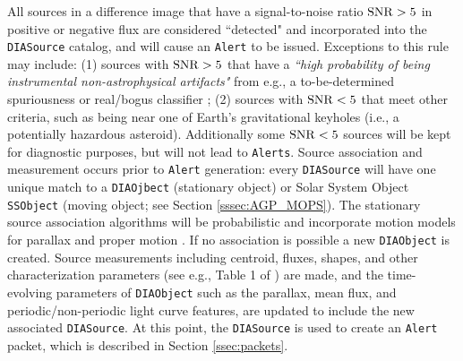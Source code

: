 All sources in a difference image that have a signal-to-noise ratio ${\rm SNR}>5$ in positive or negative flux are considered ``detected" and incorporated into the {\tt DIASource} catalog, and will cause an {\tt Alert} to be issued. Exceptions to this rule may include: (1) sources with ${\rm SNR} > 5$ that have a {\it ``high probability of being instrumental non-astrophysical artifacts"}  from e.g., a to-be-determined spuriousness or real/bogus classifier ; (2) sources with ${\rm SNR} < 5$ that meet other criteria, such as being near one of Earth's gravitational keyholes (i.e., a potentially hazardous asteroid). Additionally some ${\rm SNR} < 5$ sources will be kept for diagnostic purposes, but will not lead to {\tt Alerts}. Source association and measurement occurs prior to {\tt Alert} generation: every {\tt DIASource} will have one unique match to a {\tt DIAOjbect} (stationary object) or Solar System Object {\tt SSObject} (moving object; see Section \ref{sssec:AGP_MOPS}). The stationary source association algorithms will be probabilistic and incorporate motion models for parallax and proper motion . If no association is possible a new {\tt DIAObject} is created. Source measurements including centroid, fluxes, shapes, and other characterization parameters (see e.g., Table 1 of ) are made, and the time-evolving parameters of {\tt DIAObject} such as the parallax, mean flux, and periodic/non-periodic light curve features, are updated to include the new associated {\tt DIASource}. At this point, the {\tt DIASource} is used to create an {\tt Alert} packet, which is described in Section \ref{ssec:packets}.

